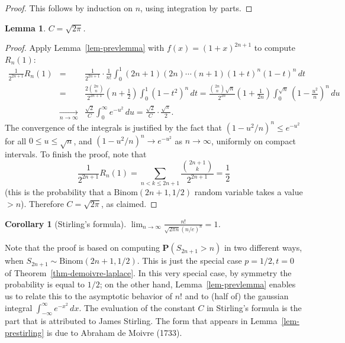\documentclass[12pt]{article}
\newtheorem{lem}[thm]{Lemma}
\newtheorem{cor}[thm]{Corollary}
\newcommand{\prob}{\mathbf{P}}
\theoremstyle{example}
\begin{document}
\begin{proof} This follows by induction on $n$, using integration by parts.
\end{proof}

\begin{lem} $C=\sqrt{2\pi}$.
\end{lem}

\begin{proof} Apply Lemma~\ref{lem-prevlemma} with $f(x) = (1+x)^{2n+1}$ to compute $R_n(1)$:
\begin{eqnarray*}
\frac{1}{2^{2n+1}} R_n(1) &=& \frac{1}{2^{2n+1}} \cdot \frac{1}{n!}\int_0^1 (2n+1)(2n)\cdots (n+1)(1+t)^n (1-t)^n
\,dt \\ &=& \frac{2 \binom{2n}{n}}{2^{2n+1}} (n+\frac12) \int_0^1 (1-t^2)^n\, dt = \frac{ \binom{2n}{n} \sqrt{n}}{2^{2n}}
(1+\frac{1}{2n}) \int_0^{\sqrt{n}} \left(1-\frac{u^2}{n}\right)^n\,du
\\ &\xrightarrow[n\to\infty]{} & \frac{\sqrt{2}}{C} \int_0^\infty e^{-u^2}\,du = \frac{\sqrt{2}}{C} \cdot \frac{\sqrt{\pi}}{2}.
\end{eqnarray*}
The convergence of the integrals is justified by the fact that $(1-u^2/n)^n \le e^{-u^2}$ for all $0\le u\le \sqrt{n}$, and
$(1-u^2/n)^n \to e^{-u^2}$ as $n\to\infty$, uniformly on compact intervals. To finish the proof, note that
$$ \frac{1}{2^{2n+1}} R_n(1) = \sum_{n<k\le 2n+1} \frac{\binom{2n+1}{k}}{2^{2n+1}} = \frac12 $$
(this is the probability that a $\textrm{Binom}(2n+1,1/2)$ random variable takes a value $> n$). Therefore $C=\sqrt{2\pi}$, as claimed.
\end{proof}

\begin{cor}[Stirling's formula] $\lim_{n\to\infty} \frac{n!}{\sqrt{2\pi n} (n/e)^n}=1$.
\end{cor}

Note that the proof is based on computing $\prob(S_{2n+1} > n)$ in two different ways, when $S_{2n+1}\sim \textrm{Binom}(2n+1,1/2)$. This is just the special case $p=1/2, t=0$ of Theorem~\ref{thm-demoivre-laplace}. In this very special case, by symmetry the probability is equal to $1/2$; on the other hand, Lemma~\ref{lem-prevlemma} enables us to relate this to the asymptotic behavior of $n!$ and to (half of) the gaussian integral $\int_{-\infty}^\infty e^{-x^2}\,dx$. The evaluation of the constant $C$ in Stirling's formula is the part that is attributed to James Stirling. The form that appears in Lemma~\ref{lem-prestirling} is due to Abraham de Moivre (1733).
\end{document}
